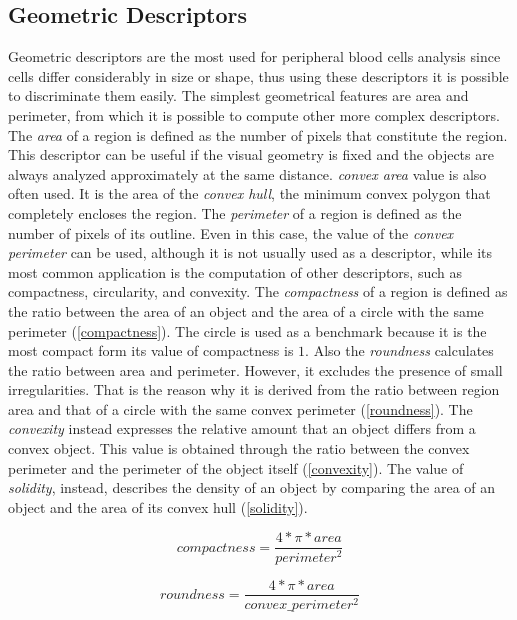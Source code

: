\documentclass[final,a4paper,12pt,english]{UnicaPhdThesis3}
\begin{document}
\subsection{Geometric Descriptors} %
Geometric descriptors are the most used for peripheral blood cells analysis since cells differ considerably in size or shape, thus using these descriptors it is possible to discriminate them easily. The simplest geometrical features are area and perimeter, from which it is possible to compute other more complex descriptors. The \textit{area} of a region is defined as the number of pixels that constitute the region. This descriptor can be useful if the visual geometry is fixed and the objects are always analyzed approximately at the same distance. \textit{convex area} value is also often used. It is the area of the \textit{convex hull}, the minimum convex polygon that completely encloses the region.
The \textit{perimeter} of a region is defined as the number of pixels of its outline. Even in this case, the value of the \textit{convex perimeter} can be used, although it is not usually used as a descriptor, while its most common application is the computation of other descriptors, such as compactness, circularity, and convexity. The \textit{compactness} of a region is defined as the ratio between the area of an object and the area of a circle with the same perimeter (\ref{compactness}). The circle is used as a benchmark because it is the most compact form its value of compactness is $1$. Also the \textit{roundness} calculates the ratio between area and perimeter. However, it excludes the presence of small irregularities. That is the reason why it is derived from the ratio between region area and that of a circle with the same convex perimeter (\ref{roundness}). The \textit{convexity} instead expresses the relative amount that an object differs from a convex object. This value is obtained through the ratio between the convex perimeter and the perimeter of the object itself (\ref{convexity}). The value of \textit{solidity}, instead, describes the density of an object by comparing the area of an object and the area of its convex hull (\ref{solidity}).

\begin{equation}\label{compactness}
compactness=\frac{4*\pi*area}{perimeter^2}
\end{equation}

\begin{equation}\label{roundness}
roundness=\frac{4*\pi*area}{convex\_perimeter^2}
\end{equation}
\end{document}
